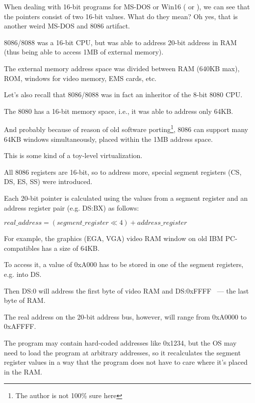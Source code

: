 \label{8086_memory_model}

When dealing with 16-bit programs for MS-DOS or Win16
( or ),
we can see that the pointers consist of two 16-bit values.
What do they mean? Oh yes, that is another weird MS-DOS and 8086 artifact.

8086/8088 was a 16-bit CPU, but was able to address 20-bit address in RAM 
(thus being able to access 1MB of external memory).

The external memory address space was divided between \ac{RAM} (640KB max),
\ac{ROM}, windows for video memory, EMS cards, etc.

Let's also recall that 8086/8088 was in fact an inheritor of the 8-bit 8080 CPU.

The 8080 has a 16-bit memory space, i.e., it was able to address only 64KB.

And probably because of reason of old software porting\footnote{The author is not 100\% sure here},
8086 can support many 64KB windows simultaneously, placed
within the 1MB address space.

This is some kind of a toy-level virtualization.

All 8086 registers are 16-bit, so to address more, special segment registers (CS, DS, ES, SS) were
introduced.

Each 20-bit pointer is calculated using the values from a segment register and 
an address register pair (e.g. DS:BX) as follows:

\begin{center}
$real\_address = (segment\_register \ll 4) + address\_register$
\end{center}

For example, the graphics (\ac{EGA}, \ac{VGA}) video \ac{RAM} window on old IBM PC-compatibles 
has a size of 64KB.

To access it, a value of 0xA000 has to be stored in one of the segment registers, e.g. into DS.

Then DS:0 will address the first byte of video \ac{RAM} and DS:0xFFFF ~--- the last byte of RAM.

The real address on the 20-bit address bus, however, will range from 0xA0000 to 0xAFFFF.

The program may contain hard-coded addresses like 0x1234, but the \ac{OS} may need to load the program at arbitrary
addresses, so it recalculates the segment register values in a way that the program does not have to care 
where it's placed in the RAM.

